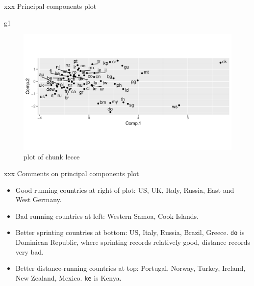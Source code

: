\documentclass[ignorenonframetext,]{beamer}
\newenvironment{Shaded}{\begin{snugshade}}{\end{snugshade}}
\newcommand{\NormalTok}[1]{#1}
\begin{document}
\begin{frame}[fragile]{xxx Principal components plot}
\protect\hypertarget{xxx-principal-components-plot}{}

\begin{Shaded}
\begin{Highlighting}[]
\NormalTok{g1}
\end{Highlighting}
\end{Shaded}

\begin{figure}
\centering
\includegraphics{figure/lecce-1.pdf}
\caption{plot of chunk lecce}
\end{figure}

\end{frame}

\begin{frame}[fragile]{xxx Comments on principal components plot}
\protect\hypertarget{xxx-comments-on-principal-components-plot}{}

\begin{itemize}
\item
  Good running countries at right of plot: US, UK, Italy, Russia, East
  and West Germany.
\item
  Bad running countries at left: Western Samoa, Cook Islands.
\item
  Better sprinting countries at bottom: US, Italy, Russia, Brazil,
  Greece. \texttt{do} is Dominican Republic, where sprinting records
  relatively good, distance records very bad.
\item
  Better distance-running countries at top: Portugal, Norway, Turkey,
  Ireland, New Zealand, Mexico. \texttt{ke} is Kenya.
\end{itemize}

\end{frame}
\end{document}
